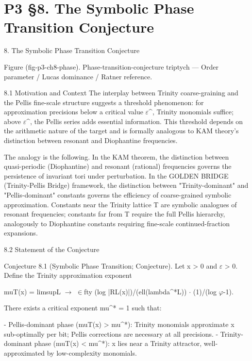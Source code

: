 
\section{P3 §8. The Symbolic Phase Transition Conjecture}

8. The Symbolic Phase Transition Conjecture

         Figure (fig-p3-ch8-phase). Phase-transition-conjecture triptych --- Order parameter / Lucas
                                       dominance / Ratner reference.

  8.1 Motivation and Context
  The interplay between Trinity coarse-graining and the Pellis fine-scale structure
  suggests a threshold phenomenon: for approximation precisions below a critical value
  $\varepsilon$\textasciicircum{}, Trinity monomials suffice; above $\varepsilon$\textasciicircum{}, the Pellis series adds essential information.
  This threshold depends on the arithmetic nature of the target and is formally analogous
  to KAM theory's distinction between resonant and Diophantine frequencies.

  The analogy is the following. In the KAM theorem, the distinction between
  quasi-periodic (Diophantine) and resonant (rational) frequencies governs the
  persistence of invariant tori under perturbation. In the GOLDEN BRIDGE (Trinity-Pellis Bridge) framework, the
  distinction between "Trinity-dominant" and "Pellis-dominant" constants governs the
  efficiency of coarse-grained symbolic approximation. Constants near the Trinity lattice
  T are symbolic analogues of resonant frequencies; constants far from T require the full
  Pellis hierarchy, analogously to Diophantine constants requiring fine-scale
  continued-fraction expansions.

  8.2 Statement of the Conjecture

        Conjecture 8.1 (Symbolic Phase Transition; Conjecture). Let x > 0 and $\varepsilon$ > 0.
        Define the Trinity approximation exponent

  muT(x) = limsupL $\rightarrow$ $\in$fty (log |RL(x)|)/(ell(lambda\textasciicircum{}*L)) $\cdot$ (1)/(log $\varphi$-1).

  There exists a critical exponent mu\textasciicircum{}* = 1 such that:

  - Pellis-dominant phase (muT(x) > mu\textasciicircum{}*): Trinity monomials approximate                                 x
  sub-optimally per bit; Pellis corrections are necessary at all precisions.
  - Trinity-dominant phase (muT(x) < mu\textasciicircum{}*): x lies near a Trinity attractor,
  well-approximated by low-complexity monomials.


